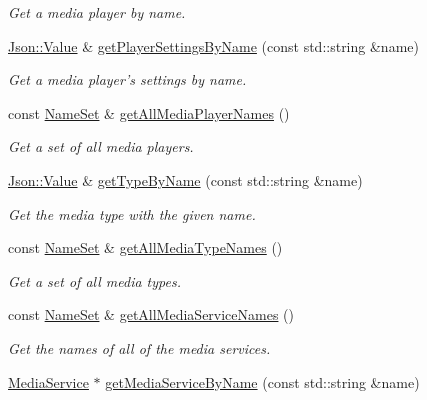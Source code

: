 \begin{DoxyCompactItemize}
\begin{DoxyCompactList}\small\item\em Get a media player by name. \end{DoxyCompactList}\item 
\hyperlink{class_json_1_1_value}{Json\-::\-Value} \& \hyperlink{class_a_w_e_1_1_global_settings_a27fbf04ccbc5fb4bf42db0412ff2ab23}{get\-Player\-Settings\-By\-Name} (const std\-::string \&name)
\begin{DoxyCompactList}\small\item\em Get a media player's settings by name. \end{DoxyCompactList}\item 
const \hyperlink{class_a_w_e_1_1_global_settings_a45df15954e36fb1bad5385f5249c408e}{Name\-Set} \& \hyperlink{class_a_w_e_1_1_global_settings_a0fb7bb8eba01fa51841a827741a0731a}{get\-All\-Media\-Player\-Names} ()
\begin{DoxyCompactList}\small\item\em Get a set of all media players. \end{DoxyCompactList}\item 
\hyperlink{class_json_1_1_value}{Json\-::\-Value} \& \hyperlink{class_a_w_e_1_1_global_settings_ab7026bd5fdd6c7b566a1d5c71ef4b21e}{get\-Type\-By\-Name} (const std\-::string \&name)
\begin{DoxyCompactList}\small\item\em Get the media type with the given name. \end{DoxyCompactList}\item 
const \hyperlink{class_a_w_e_1_1_global_settings_a45df15954e36fb1bad5385f5249c408e}{Name\-Set} \& \hyperlink{class_a_w_e_1_1_global_settings_a4104e5ab20b0e63eccc887ef84d8581f}{get\-All\-Media\-Type\-Names} ()
\begin{DoxyCompactList}\small\item\em Get a set of all media types. \end{DoxyCompactList}\item 
const \hyperlink{class_a_w_e_1_1_global_settings_a45df15954e36fb1bad5385f5249c408e}{Name\-Set} \& \hyperlink{class_a_w_e_1_1_global_settings_a836c7a1e4d711e64fcc87b2908a2eb4e}{get\-All\-Media\-Service\-Names} ()
\begin{DoxyCompactList}\small\item\em Get the names of all of the media services. \end{DoxyCompactList}\item 
\hyperlink{class_a_w_e_1_1_media_service}{Media\-Service} $\ast$ \hyperlink{class_a_w_e_1_1_global_settings_ad0d26204fee1973539c9a6962ea9f462}{get\-Media\-Service\-By\-Name} (const std\-::string \&name)

\end{DoxyCompactItemize}
